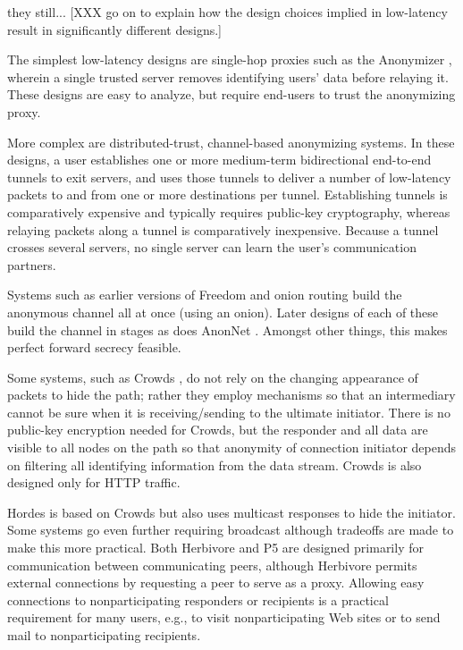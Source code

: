 \documentclass[times,10pt,twocolumn]{article}
\begin{document}
they still...  
[XXX go on to explain how the design choices implied in low-latency result in
significantly different designs.]

The simplest low-latency designs are single-hop proxies such as the
Anonymizer \cite{anonymizer}, wherein a single trusted server removes
identifying users' data before relaying it.  These designs are easy to
analyze, but require end-users to trust the anonymizing proxy.

More complex are distributed-trust, channel-based anonymizing systems.  In
these designs, a user establishes one or more medium-term bidirectional
end-to-end tunnels to exit servers, and uses those tunnels to deliver a
number of low-latency packets to and from one or more destinations per
tunnel.  Establishing tunnels is comparatively expensive and typically
requires public-key cryptography, whereas relaying packets along a tunnel is
comparatively inexpensive.  Because a tunnel crosses several servers, no
single server can learn the user's communication partners.

Systems such as earlier versions of Freedom and onion routing
build the anonymous channel all at once (using an onion). Later
designs of each of these build the channel in stages as does AnonNet
\cite{anonnet}. Amongst other things, this makes perfect forward
secrecy feasible.

Some systems, such as Crowds \cite{crowds-tissec}, do not rely on the
changing appearance of packets to hide the path; rather they employ
mechanisms so that an intermediary cannot be sure when it is
receiving/sending to the ultimate initiator. There is no public-key
encryption needed for Crowds, but the responder and all data are
visible to all nodes on the path so that anonymity of connection
initiator depends on filtering all identifying information from the
data stream. Crowds is also designed only for HTTP traffic.

Hordes \cite{hordes-jcs} is based on Crowds but also uses multicast
responses to hide the initiator. Some systems go even further
requiring broadcast \cite{herbivore,p5} although tradeoffs are made to
make this more practical. Both Herbivore and P5 are designed primarily
for communication between communicating peers, although Herbivore
permits external connections by requesting a peer to serve as a proxy.
Allowing easy connections to nonparticipating responders or recipients
is a practical requirement for many users, e.g., to visit
nonparticipating Web sites or to send mail to nonparticipating
recipients.
\end{document}
